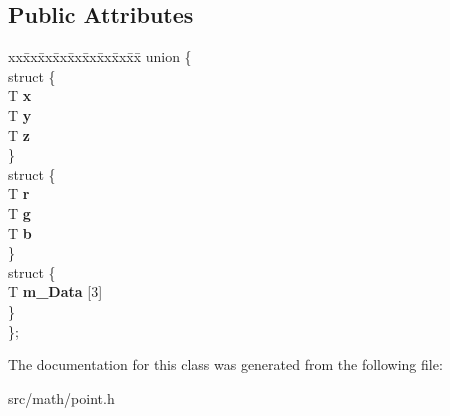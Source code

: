 \subsection*{Public Attributes}
\begin{DoxyCompactItemize}
\item 
\mbox{\label{class_point_a2e3d82605ec9693362663a1b80864c84}} 
\begin{tabbing}
xx\=xx\=xx\=xx\=xx\=xx\=xx\=xx\=xx\=\kill
union \{\\
\mbox{\label{union_point_1_1_0D0_a24eb859208a9c806032b1d58e87a00ea}} 
\>struct \{\\
\>\>T {\bfseries x}\\
\>\>T {\bfseries y}\\
\>\>T {\bfseries z}\\
\>\} \\
\mbox{\label{union_point_1_1_0D0_ad089e77f7fd01dd8076652f23db9ca77}} 
\>struct \{\\
\>\>T {\bfseries r}\\
\>\>T {\bfseries g}\\
\>\>T {\bfseries b}\\
\>\} \\
\mbox{\label{union_point_1_1_0D0_a7127a6e1f90dea68e2241221edb3b8f3}} 
\>struct \{\\
\>\>T {\bfseries m\_Data} \mbox{[}3\mbox{]}\\
\>\} \\
\}; \\

\end{tabbing}\end{DoxyCompactItemize}


The documentation for this class was generated from the following file\+:\begin{DoxyCompactItemize}
\item 
src/math/point.\+h\end{DoxyCompactItemize}
